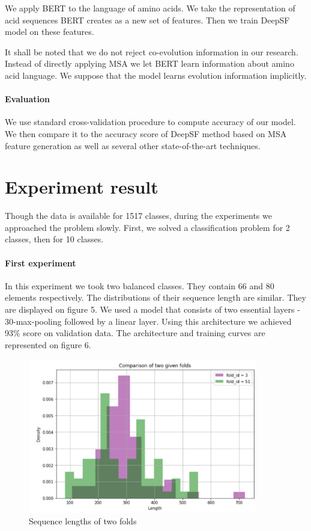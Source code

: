 \documentclass[12pt, twoside]{article}
\begin{document}
We apply BERT to the language of amino acids. We take the representation of acid sequences BERT creates as a new set of features. Then we train DeepSF model on these features.

It shall be noted that we do not reject co-evolution information in our research. Instead of directly applying MSA we let BERT learn information about amino acid language. We suppose that the model learns evolution information implicitly.

\paragraph{Evaluation}
\noindent
We use standard cross-validation procedure to compute accuracy of our model. We then compare it to the accuracy score of DeepSF method based on MSA feature generation as well as several other state-of-the-art techniques. 

\section{Experiment result}
Though the data is available for 1517 classes, during the experiments we approached the problem slowly. First, we solved a classification problem for 2 classes, then for 10 classes.

\paragraph{First experiment}
\noindent In this experiment we took two balanced classes. They contain 66 and 80 elements respectively. The distributions of their sequence length are similar. They are displayed on figure 5. We used a model that consists of two essential layers - 30-max-pooling followed by a linear layer. Using this architecture we achieved 93\% score on validation data. The architecture and training curves are represented on figure 6.  
\begin{figure}[htp]
    \centering
    \includegraphics[width=10cm]{figures/figure5.pdf}
    \caption{Sequence lengths of two folds}
\end{figure}
\end{document}
